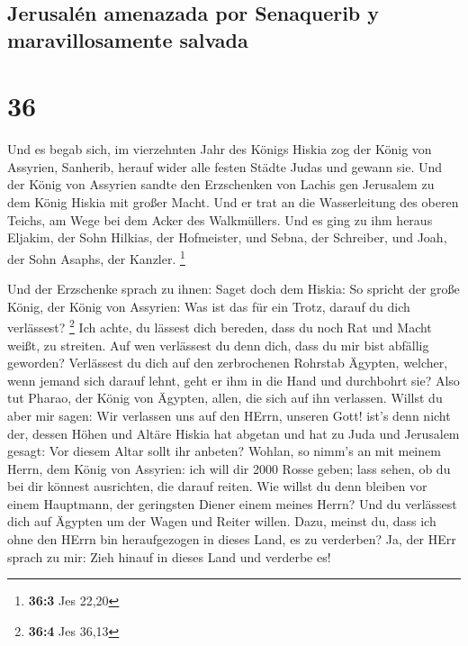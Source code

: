 \hypertarget{jerusaluxe9n-amenazada-por-senaquerib-y-maravillosamente-salvada}{%
\subsection{Jerusalén amenazada por Senaquerib y maravillosamente
salvada}\label{jerusaluxe9n-amenazada-por-senaquerib-y-maravillosamente-salvada}}

\hypertarget{section-35}{%
\section{36}\label{section-35}}

 Und es begab sich, im vierzehnten Jahr des Königs Hiskia
zog der König von Assyrien, Sanherib, herauf wider alle festen Städte
Judas und gewann sie.  Und der König von Assyrien sandte
den Erzschenken von Lachis gen Jerusalem zu dem König Hiskia mit großer
Macht. Und er trat an die Wasserleitung des oberen Teichs, am Wege bei
dem Acker des Walkmüllers.  Und es ging zu ihm heraus
Eljakim, der Sohn Hilkias, der Hofmeister, und Sebna, der Schreiber, und
Joah, der Sohn Asaphs, der Kanzler. \footnote{\textbf{36:3} Jes 22,20}

 Und der Erzschenke sprach zu ihnen: Saget doch dem
Hiskia: So spricht der große König, der König von Assyrien: Was ist das
für ein Trotz, darauf du dich verlässest? \footnote{\textbf{36:4} Jes
  36,13}  Ich achte, du lässest dich bereden, dass du noch
Rat und Macht weißt, zu streiten. Auf wen verlässest du denn dich, dass
du mir bist abfällig geworden?  Verlässest du dich auf den
zerbrochenen Rohrstab Ägypten, welcher, wenn jemand sich darauf lehnt,
geht er ihm in die Hand und durchbohrt sie? Also tut Pharao, der König
von Ägypten, allen, die sich auf ihn verlassen.  Willst du
aber mir sagen: Wir verlassen uns auf den HErrn, unseren Gott! ist's
denn nicht der, dessen Höhen und Altäre Hiskia hat abgetan und hat zu
Juda und Jerusalem gesagt: Vor diesem Altar sollt ihr anbeten?
 Wohlan, so nimm's an mit meinem Herrn, dem König von
Assyrien: ich will dir 2000 Rosse geben; lass sehen, ob du bei dir
könnest ausrichten, die darauf reiten.  Wie willst du denn
bleiben vor einem Hauptmann, der geringsten Diener einem meines Herrn?
Und du verlässest dich auf Ägypten um der Wagen und Reiter willen.
 Dazu, meinst du, dass ich ohne den HErrn bin
heraufgezogen in dieses Land, es zu verderben? Ja, der HErr sprach zu
mir: Zieh hinauf in dieses Land und verderbe es!

